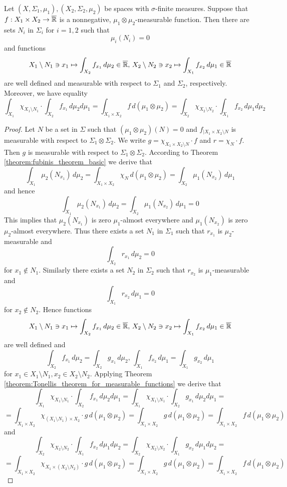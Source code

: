 \begin{theorem}\label{theorem:Tonellis_theorem_for_mu_measurable_functions}
Let $(X,\Sigma_1,\mu_1), (X_2,\Sigma_2,\mu_2)$ be spaces with $\sigma$-finite measures. Suppose that $f:X_1\times X_2\rightarrow \overline{{\mathbb R}}$ is a nonnegative, $\mu_1\otimes \mu_2$-measurable function. Then there are sets $N_i$ in $\Sigma_i$ for $i=1,2$ such that
$$\mu_i(N_i) = 0$$ 
and functions
$$X_1\setminus N_1\ni x_1\mapsto \int_{X_2}f_{x_1}\,d\mu_2\in \overline{{\mathbb R}},\,X_2\setminus N_2\ni x_2\mapsto \int_{X_1}f_{x_2}\,d\mu_1\in \overline{{\mathbb R}}$$
are well defined and measurable with respect to $\Sigma_1$ and $\Sigma_2$, respectively. Moreover, we have equality
$$\int_{X_1}\chi_{X_1\setminus N_1}\cdot \int_{X_2} f_{x_1}\,d\mu_2d\mu_1 = \int_{X_1\times X_2}f\,d(\mu_1\otimes \mu_2) = \int_{X_2}\chi_{X_2\setminus N_2}\cdot\int_{X_1} f_{x_2}\,d\mu_1d\mu_2$$
\end{theorem}
\begin{proof}
Let $N$ be a set in $\Sigma$ such that $\left(\mu_1\otimes \mu_2\right)(N) = 0$ and $f_{\mid X_1\times X_2\setminus N}$ is measurable with respect to $\Sigma_1\otimes \Sigma_2$. We write $g = \chi_{X_1\times X_2\setminus N}\cdot f$ and $r = \chi_N\cdot f$. Then $g$ is measurable with respect to $\Sigma_1\otimes \Sigma_2$. According to Theorem \ref{theorem:fubinis_theorem_basic} we derive that
$$\int_{X_1}\mu_2(N_{x_1})\,d\mu_2 = \int_{X_1\times X_2}\chi_N\,d\left(\mu_1\otimes \mu_2\right) = \int_{X_2}\mu_1(N_{x_2})\,d\mu_1$$
and hence
$$\int_{X_1}\mu_2(N_{x_1})\,d\mu_2 = \int_{X_2}\mu_1(N_{x_2})\,d\mu_1 = 0$$
This implies that $\mu_2(N_{x_1})$ is zero $\mu_1$-almost everywhere and $\mu_1(N_{x_2})$ is zero $\mu_2$-almost everywhere. Thus there exists a set $N_1$ in $\Sigma_1$ such that $r_{x_1}$ is $\mu_2$-measurable and
$$\int_{X_2}r_{x_1}\,d\mu_2 = 0$$
for $x_1\not \in N_1$. Similarly there exists a set $N_2$ in $\Sigma_2$ such that $r_{x_2}$ is $\mu_1$-measurable and
$$\int_{X_1}r_{x_2}\,d\mu_1 = 0$$
for $x_2\not \in N_2$. Hence functions
$$X_1\setminus N_1\ni x_1\mapsto \int_{X_2}f_{x_1}\,d\mu_2\in \overline{{\mathbb R}},\,X_2\setminus N_2\ni x_2\mapsto \int_{X_1}f_{x_2}\,d\mu_1\in \overline{{\mathbb R}}$$
are well defined and
$$\int_{X_2}f_{x_1}\,d\mu_2 = \int_{X_2}g_{x_1}\,d\mu_2,\,\int_{X_1}f_{x_2}\,d\mu_1 = \int_{X_1}g_{x_2}\,d\mu_1$$
for $x_1 \in X_1\setminus N_1,x_2\in X_2\setminus N_2$. Applying Theorem \ref{theorem:Tonellis_theorem_for_measurable_functions} we derive that
$$\int_{X_1}\chi_{X_1\setminus N_1}\cdot \int_{X_2} f_{x_1}\,d\mu_2d\mu_1 = \int_{X_1}\chi_{X_1\setminus N_1}\cdot \int_{X_2} g_{x_1}\,d\mu_2d\mu_1 =$$
$$= \int_{X_1\times X_2}\chi_{\left(X_1\setminus N_1\right)\times X_2}\cdot g\,d\left(\mu_1\otimes \mu_2\right) = \int_{X_1\times X_2}g\,d\left(\mu_1\otimes \mu_2\right) = \int_{X_1\times X_2}f\,d\left(\mu_1\otimes \mu_2\right)$$
and
$$\int_{X_2}\chi_{X_2\setminus N_2}\cdot \int_{X_1} f_{x_2}\,d\mu_1d\mu_2 = \int_{X_2}\chi_{X_2\setminus N_2}\cdot \int_{X_1} g_{x_2}\,d\mu_1d\mu_2 =$$
$$= \int_{X_1\times X_2}\chi_{X_1\times \left(X_2 \setminus N_2\right)}\cdot g\,d\left(\mu_1\otimes \mu_2\right) = \int_{X_1\times X_2}g\,d\left(\mu_1\otimes \mu_2\right) = \int_{X_1\times X_2}f\,d\left(\mu_1\otimes \mu_2\right)$$
\end{proof}

